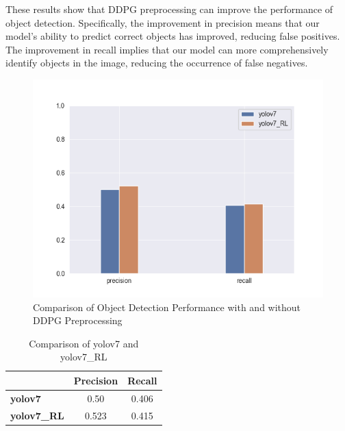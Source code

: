 \documentclass{PHlab-thesis}
\begin{document}
These results show that DDPG preprocessing can improve the performance of object detection. Specifically, the improvement in precision means that our model's ability to predict correct objects has improved, reducing false positives. The improvement in recall implies that our model can more comprehensively identify objects in the image, reducing the occurrence of false negatives.
\begin{figure}[H] 
    \centering 
    \includegraphics[width=\textwidth]{images/comparison result.png}
    \caption[Comparison Result]{Comparison of Object Detection Performance with and without DDPG Preprocessing} 
    \label{Fig.Comparison result} 
\end{figure}

\begin{table}[H]
    \centering
    \label{table:comparison_result}
    \begin{tabular}{l c c}
        \toprule
        & \textbf{Precision} & \textbf{Recall} \\
        \midrule
        \textbf{yolov7} & 0.50 & 0.406 \\
        \textbf{yolov7\_RL} & 0.523 & 0.415 \\
        \bottomrule
    \end{tabular}
    \caption{Comparison of yolov7 and yolov7\_RL}
\end{table}

\newpage
\end{document}
